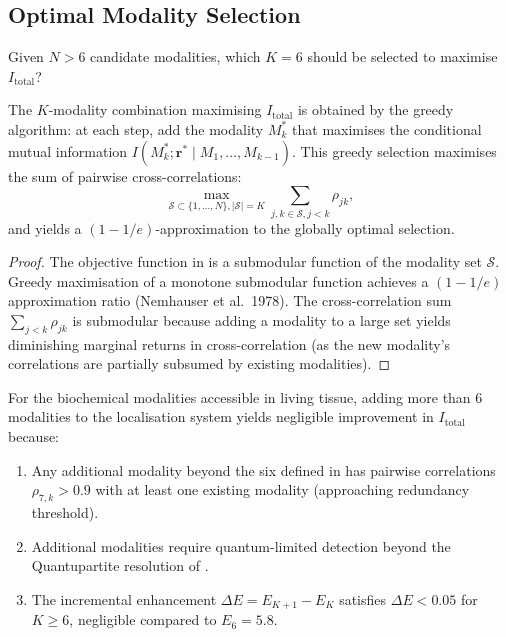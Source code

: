 \subsection{Optimal Modality Selection}
\label{sec:ch06-optimal-selection}

Given $N > 6$ candidate modalities, which $K = 6$ should be selected to
maximise $I_\mathrm{total}$?

\begin{theorem}
\label{thm:ch06-optimal-selection}
The $K$-modality combination maximising $I_\mathrm{total}$ is obtained by
the greedy algorithm: at each step, add the modality $M_k^*$ that maximises
the conditional mutual information $I(M_k^*;\mathbf{r}^* \mid M_1,\ldots,
M_{k-1})$.  This greedy selection maximises the sum of pairwise cross-correlations:
\begin{equation}
  \max_{\mathcal{S} \subset \{1,\ldots,N\}, |\mathcal{S}|=K}
  \sum_{j,k \in \mathcal{S}, j < k} \rho_{jk},
  \label{eq:ch06-modality-selection}
\end{equation}
and yields a $(1 - 1/e)$-approximation to the globally optimal selection.
\end{theorem}

\begin{proof}
The objective function in  is a submodular
function of the modality set $\mathcal{S}$.  Greedy maximisation of a
monotone submodular function achieves a $(1 - 1/e)$ approximation ratio
(Nemhauser et al.\ 1978).  The cross-correlation sum $\sum_{j<k}\rho_{jk}$
is submodular because adding a modality to a large set yields diminishing
marginal returns in cross-correlation (as the new modality's correlations
are partially subsumed by existing modalities).
\end{proof}

\begin{corollary}
\label{cor:ch06-diminishing-returns}
For the biochemical modalities accessible in living tissue, adding more
than 6 modalities to the localisation system yields negligible improvement in
$I_\mathrm{total}$ because:
\begin{enumerate}[label=(\alph*),leftmargin=2em]
  \item Any additional modality beyond the six defined in 
    has pairwise correlations $\rho_{7,k} > 0.9$ with at least one existing
    modality (approaching redundancy threshold).
  \item Additional modalities require quantum-limited detection beyond the
    Quantupartite resolution of .
  \item The incremental enhancement $\Delta E = E_{K+1} - E_K$ satisfies
    $\Delta E < 0.05$ for $K \ge 6$, negligible compared to $E_6 = 5.8$.
\end{enumerate}
\end{corollary}


